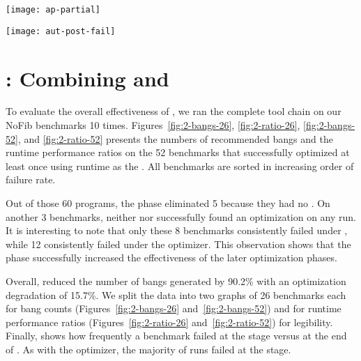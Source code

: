 \begin{figure*}
\texttt{[image: ap-partial]}
\label{fig:post-ratio-some}
\end{figure*}

\begin{figure*}
\texttt{[image: aut-post-fail]}
\label{fig:post-failures}
\end{figure*}


\section{\At{}: Combining \preopt{} and \postopt{}}

To evaluate the overall effectiveness of \At{}, we ran the complete
tool chain on our NoFib benchmarks 10 times. Figures~\ref{fig:2-bangs-26}, \ref{fig:2-ratio-26}, \ref{fig:2-bangs-52},
and \ref{fig:2-ratio-52} presents the numbers of recommended bangs and
the runtime performance ratios on the 52 benchmarks that \At{}
successfully optimized at least once using runtime as the \profm{}.
All benchmarks are sorted in increasing order of \At{} failure rate.

Out of those 60 programs, the \preopt{} phase eliminated 5 because they had no \hotspots{}.  
On another 3 benchmarks, neither \Ao{} nor \At{}
successfully found an optimization on any run.
It is interesting to note that only these 8
benchmarks consistently failed under \At{}, while 12
consistently failed under the \Postopt{} optimizer.
This observation shows that the \preopt{} phase successfully
increased the effectiveness of the later optimization phases.

Overall, \At{} reduced the number of bangs generated by 90.2\%
with an optimization degradation of 15.7\%.
We split the data into two graphs of 26 benchmarks each for bang counts
(Figures~\ref{fig:2-bangs-26} and~\ref{fig:2-bangs-52})
and for runtime performance ratios
(Figures~\ref{fig:2-ratio-26} and~\ref{fig:2-ratio-52})
for legibility.
Finally,  shows how frequently a benchmark
failed at the \Ao{} stage versus at the end of \At{}. As with
the \postopt{} optimizer, the majority of runs failed at the \Ao{} stage.



